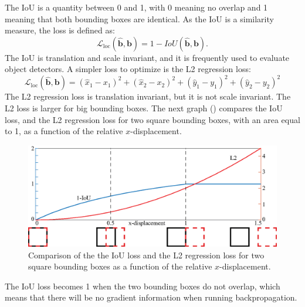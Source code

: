 The IoU is a quantity between 0 and 1, with 0 meaning no overlap and 1 meaning that both bounding boxes are identical. As the IoU is a similarity measure, the loss is defined as:
\begin{equation}
\mathcal{L}_{\text{loc}} (\hat{\mathbf{b}}, \mathbf{b})= 1-IoU (\hat{\mathbf{b}}, \mathbf{b}).
\end{equation}
The IoU is translation and scale invariant, and it is frequently used to evaluate object detectors. A simpler loss to optimize is the L2 regression loss:
\begin{equation}
\mathcal{L}_{\text{loc}} (\hat{\mathbf{b}}, \mathbf{b}) = (\hat{x}_1 - x_1)^2 + (\hat{x}_2 - x_2)^2 + (\hat{y}_1 - y_1)^2 + (\hat{y}_2 - y_2)^2
\end{equation}
The L2 regression loss is translation invariant, but it is not scale invariant. The L2 loss is larger for big bounding boxes. The next graph (\fig{\ref{fig:iou_l2_comparison}}) compares the IoU loss, and the L2 regression loss for two square bounding boxes, with an area equal to 1, as a function of the relative $x$-displacement.

\begin{figure}
\centerline{
\includegraphics[width=1\linewidth]{figures/object_recognition/iou_l2_comparison.eps}
}
\caption{Comparison of the the IoU loss and the L2 regression loss for two square bounding boxes as a function of the relative $x$-displacement.}
\label{fig:iou_l2_comparison}
\end{figure}

The IoU loss becomes 1 when the two bounding boxes do not overlap, which means that there will be no gradient information when running backpropagation. 

